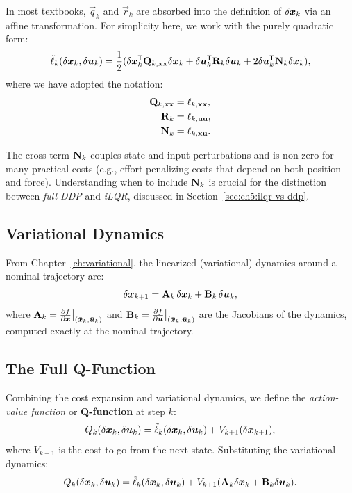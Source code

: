 In most textbooks, $\vec{q}_k$ and $\vec{r}_k$ are absorbed into the definition of $\delta\bm{x}_k$ via an affine
transformation. For simplicity here, we work with the purely quadratic form:
\begin{equation}
\tilde{\ell}_k(\delta\bm{x}_k, \delta\bm{u}_k) = \frac{1}{2}(\delta\bm{x}_k^{\mathsf{T}}\mathbf{Q}_{k,\mathbf{x}\mathbf{x}}\delta\bm{x}_k + \delta\bm{u}_k^{\mathsf{T}}\mathbf{R}_k\delta\bm{u}_k
+ 2\delta\bm{u}_k^{\mathsf{T}}\mathbf{N}_k\delta\bm{x}_k),
\label{eq:ch5:quadratic-cost}
\end{equation}
where we have adopted the notation:
\begin{align}
\mathbf{Q}_{k,\mathbf{x}\mathbf{x}} &= \ell_{k,\mathbf{x}\mathbf{x}}, \label{eq:ch5:Qxx-def}\\
\mathbf{R}_k &= \ell_{k,\mathbf{u}\mathbf{u}}, \label{eq:ch5:R-def}\\
\mathbf{N}_k &= \ell_{k,\mathbf{x}\mathbf{u}}. \label{eq:ch5:N-def}
\end{align}

The cross term $\mathbf{N}_k$ couples state and input perturbations and is non-zero for many practical costs
(e.g., effort-penalizing costs that depend on both position and force). Understanding when to include
$\mathbf{N}_k$ is crucial for the distinction between \emph{full DDP} and \emph{iLQR}, discussed in Section~\ref{sec:ch5:ilqr-vs-ddp}.

\subsection{Variational Dynamics}

From Chapter~\ref{ch:variational}, the linearized (variational) dynamics around a nominal trajectory are:
\begin{equation}
\delta\bm{x}_{k+1} = \mathbf{A}_k\,\delta\bm{x}_k + \mathbf{B}_k\,\delta\bm{u}_k,
\label{eq:ch5:perturbation}
\end{equation}
where $\mathbf{A}_k = \frac{\partial f}{\partial \bm{x}}\big|_{(\bar{\bm{x}}_k,\bar{\bm{u}}_k)}$ and
$\mathbf{B}_k = \frac{\partial f}{\partial \bm{u}}\big|_{(\bar{\bm{x}}_k,\bar{\bm{u}}_k)}$ are the Jacobians of the
dynamics, computed exactly at the nominal trajectory.

\subsection{The Full Q-Function}

Combining the cost expansion and variational dynamics, we define the \emph{action-value function} or
\textbf{Q-function} at step $k$:
\begin{equation}
Q_k(\delta\bm{x}_k, \delta\bm{u}_k) = \tilde{\ell}_k(\delta\bm{x}_k,\delta\bm{u}_k) + V_{k+1}(\delta\bm{x}_{k+1}),
\label{eq:ch5:Q-function}
\end{equation}
where $V_{k+1}$ is the cost-to-go from the next state. Substituting the variational dynamics:
\begin{equation}
Q_k(\delta\bm{x}_k, \delta\bm{u}_k) = \tilde{\ell}_k(\delta\bm{x}_k,\delta\bm{u}_k) + V_{k+1}(\mathbf{A}_k\delta\bm{x}_k + \mathbf{B}_k\delta\bm{u}_k).
\label{eq:ch5:Q-expanded}
\end{equation}

